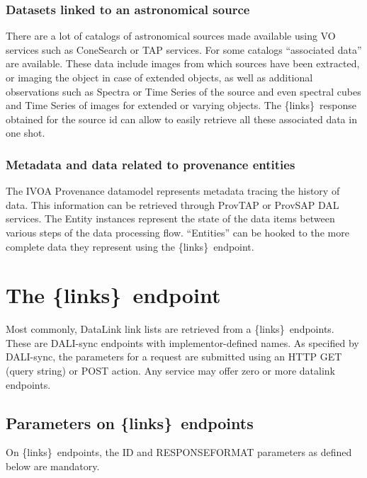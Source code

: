 \documentclass[11pt,a4paper]{ivoa}
\newcommand{\blinks}{\{links\}}
\begin{document}
\subsubsection{Datasets linked to an astronomical source}

There are  a lot of catalogs of astronomical sources made available
using VO services such as ConeSearch \citep{2008ivoa.specQ0222P} or TAP
services. For some catalogs ``associated data'' are available. These
data include images from which sources have been extracted, or imaging the
object in  case of extended objects, as well as additional observations
such as Spectra or Time Series of the source and even spectral cubes
and Time Series of images for extended or varying objects. The \blinks\
response obtained for the source id can allow to easily retrieve all
these associated data in one shot.

\subsubsection{Metadata and data related to provenance entities}

The IVOA Provenance datamodel \citep{pr:provdm} represents metadata
tracing  the history of data. This information can be retrieved through
ProvTAP \citep{iwd:provtap} or ProvSAP \citep{iwd:provsap}  DAL services.
The Entity instances represent  the state of the data items between
various steps of the data processing flow. ``Entities'' can be hooked
to the more complete data they represent using the \blinks\ endpoint.

\section{The \blinks\ endpoint}

\label{sec:linksEndpoint}

Most commonly, DataLink link lists are retrieved from a \blinks\ endpoints.
These are DALI-sync endpoints with implementor-defined names.
As specified by DALI-sync, the parameters for a request are submitted
using an HTTP GET (query string) or POST action.  Any service may offer
zero or more datalink endpoints.

\subsection{Parameters on \blinks\ endpoints}

On \blinks\ endpoints, the ID and RESPONSEFORMAT parameters as defined
below are mandatory.
\end{document}

